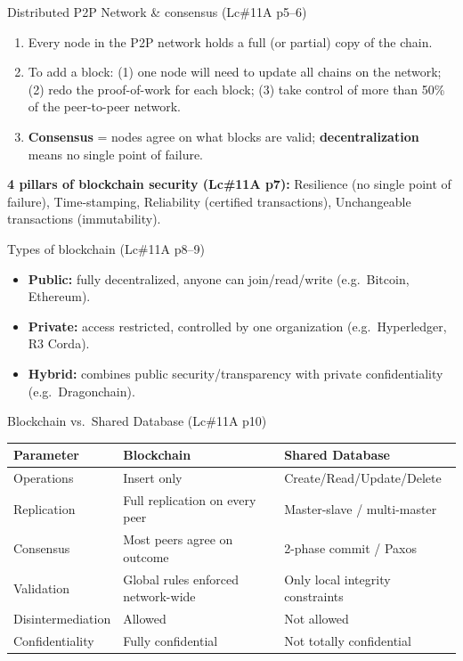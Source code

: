 \documentclass[12pt,a4paper]{article}
\begin{document}
\begin{algobox}{Distributed P2P Network \& consensus (Lc\#11A p5--6)}
\begin{enumerate}[noitemsep]
  \item Every node in the P2P network holds a full (or partial) copy of the chain.
  \item To add a block: (1) one node will need to update all chains on the network; (2) redo the proof-of-work for each block; (3) take control of more than 50\% of the peer-to-peer network.
  \item \textbf{Consensus} = nodes agree on what blocks are valid; \textbf{decentralization} means no single point of failure.
\end{enumerate}
\textbf{4 pillars of blockchain security (Lc\#11A p7):} Resilience (no single point of failure), Time-stamping, Reliability (certified transactions), Unchangeable transactions (immutability).
\end{algobox}

\begin{keybox}{Types of blockchain (Lc\#11A p8--9)}
\begin{itemize}[noitemsep]
  \item \textbf{Public:} fully decentralized, anyone can join/read/write (e.g.\ Bitcoin, Ethereum).
  \item \textbf{Private:} access restricted, controlled by one organization (e.g.\ Hyperledger, R3 Corda).
  \item \textbf{Hybrid:} combines public security/transparency with private confidentiality (e.g.\ Dragonchain).
\end{itemize}
\end{keybox}

\begin{algobox}{Blockchain vs.\ Shared Database (Lc\#11A p10)}
\begin{center}
\begin{tabular}{@{}p{3.2cm}p{4.8cm}p{4.8cm}@{}}
\toprule
\textbf{Parameter} & \textbf{Blockchain} & \textbf{Shared Database} \\
\midrule
Operations & Insert only & Create/Read/Update/Delete \\
Replication & Full replication on every peer & Master-slave / multi-master \\
Consensus & Most peers agree on outcome & 2-phase commit / Paxos \\
Validation & Global rules enforced network-wide & Only local integrity constraints \\
Disintermediation & Allowed & Not allowed \\
Confidentiality & Fully confidential & Not totally confidential \\
\bottomrule
\end{tabular}
\end{center}
\end{algobox}
\end{document}
